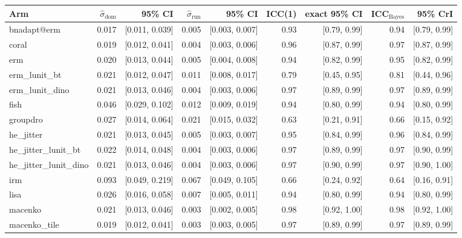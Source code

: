 \begin{tabular}{lrrrrrrrr}
\toprule
Arm & $\hat\sigma_\text{dom}$ & 95\% CI & $\hat\sigma_\text{run}$ & 95\% CI & ICC(1) & exact 95\% CI & ICC$_\text{Bayes}$ & 95\% CrI \\
\midrule
bnadapt@erm & 0.017 & [0.011, 0.039] & 0.005 & [0.003, 0.007] & 0.93 & [0.79, 0.99] & 0.94 & [0.79, 0.99] \\
coral & 0.019 & [0.012, 0.041] & 0.004 & [0.003, 0.006] & 0.96 & [0.87, 0.99] & 0.97 & [0.87, 0.99] \\
erm & 0.020 & [0.013, 0.044] & 0.005 & [0.004, 0.008] & 0.94 & [0.82, 0.99] & 0.95 & [0.82, 0.99] \\
erm\_lunit\_bt & 0.021 & [0.012, 0.047] & 0.011 & [0.008, 0.017] & 0.79 & [0.45, 0.95] & 0.81 & [0.44, 0.96] \\
erm\_lunit\_dino & 0.021 & [0.013, 0.046] & 0.004 & [0.003, 0.006] & 0.97 & [0.89, 0.99] & 0.97 & [0.89, 0.99] \\
fish & 0.046 & [0.029, 0.102] & 0.012 & [0.009, 0.019] & 0.94 & [0.80, 0.99] & 0.94 & [0.80, 0.99] \\
groupdro & 0.027 & [0.014, 0.064] & 0.021 & [0.015, 0.032] & 0.63 & [0.21, 0.91] & 0.66 & [0.15, 0.92] \\
he\_jitter & 0.021 & [0.013, 0.045] & 0.005 & [0.003, 0.007] & 0.95 & [0.84, 0.99] & 0.96 & [0.84, 0.99] \\
he\_jitter\_lunit\_bt & 0.022 & [0.014, 0.048] & 0.004 & [0.003, 0.006] & 0.97 & [0.89, 0.99] & 0.97 & [0.90, 0.99] \\
he\_jitter\_lunit\_dino & 0.021 & [0.013, 0.046] & 0.004 & [0.003, 0.006] & 0.97 & [0.90, 0.99] & 0.97 & [0.90, 1.00] \\
irm & 0.093 & [0.049, 0.219] & 0.067 & [0.049, 0.105] & 0.66 & [0.24, 0.92] & 0.64 & [0.16, 0.91] \\
lisa & 0.026 & [0.016, 0.058] & 0.007 & [0.005, 0.011] & 0.94 & [0.80, 0.99] & 0.94 & [0.80, 0.99] \\
macenko & 0.021 & [0.013, 0.046] & 0.003 & [0.002, 0.005] & 0.98 & [0.92, 1.00] & 0.98 & [0.92, 1.00] \\
macenko\_tile & 0.019 & [0.012, 0.041] & 0.003 & [0.003, 0.005] & 0.97 & [0.89, 0.99] & 0.97 & [0.89, 0.99] \\

\end{tabular}
